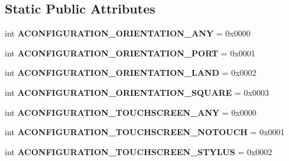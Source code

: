 \subsection*{Static Public Attributes}
\begin{DoxyCompactItemize}
\item 
\mbox{\label{classconfiguration_1_1AConfiguration_a87552766a36d8eafbea2c89e0ac57a9b}} 
int {\bfseries A\+C\+O\+N\+F\+I\+G\+U\+R\+A\+T\+I\+O\+N\+\_\+\+O\+R\+I\+E\+N\+T\+A\+T\+I\+O\+N\+\_\+\+A\+NY} = 0x0000
\item 
\mbox{\label{classconfiguration_1_1AConfiguration_a377faf6d7f9a0c1c6399e71b08eb2620}} 
int {\bfseries A\+C\+O\+N\+F\+I\+G\+U\+R\+A\+T\+I\+O\+N\+\_\+\+O\+R\+I\+E\+N\+T\+A\+T\+I\+O\+N\+\_\+\+P\+O\+RT} = 0x0001
\item 
\mbox{\label{classconfiguration_1_1AConfiguration_aca13e90e26e5a3439bdface66de415bb}} 
int {\bfseries A\+C\+O\+N\+F\+I\+G\+U\+R\+A\+T\+I\+O\+N\+\_\+\+O\+R\+I\+E\+N\+T\+A\+T\+I\+O\+N\+\_\+\+L\+A\+ND} = 0x0002
\item 
\mbox{\label{classconfiguration_1_1AConfiguration_a2d15228cb63164d34f26ade4815e765a}} 
int {\bfseries A\+C\+O\+N\+F\+I\+G\+U\+R\+A\+T\+I\+O\+N\+\_\+\+O\+R\+I\+E\+N\+T\+A\+T\+I\+O\+N\+\_\+\+S\+Q\+U\+A\+RE} = 0x0003
\item 
\mbox{\label{classconfiguration_1_1AConfiguration_a594a65dfe5be1f828e06f79a94f476ff}} 
int {\bfseries A\+C\+O\+N\+F\+I\+G\+U\+R\+A\+T\+I\+O\+N\+\_\+\+T\+O\+U\+C\+H\+S\+C\+R\+E\+E\+N\+\_\+\+A\+NY} = 0x0000
\item 
\mbox{\label{classconfiguration_1_1AConfiguration_ab5bab31740ecd2e61eaa826c23122b15}} 
int {\bfseries A\+C\+O\+N\+F\+I\+G\+U\+R\+A\+T\+I\+O\+N\+\_\+\+T\+O\+U\+C\+H\+S\+C\+R\+E\+E\+N\+\_\+\+N\+O\+T\+O\+U\+CH} = 0x0001
\item 
\mbox{\label{classconfiguration_1_1AConfiguration_ac6fe85ef546152dfd44d0ae16a7848e6}} 
int {\bfseries A\+C\+O\+N\+F\+I\+G\+U\+R\+A\+T\+I\+O\+N\+\_\+\+T\+O\+U\+C\+H\+S\+C\+R\+E\+E\+N\+\_\+\+S\+T\+Y\+L\+US} = 0x0002

\end{DoxyCompactItemize}
